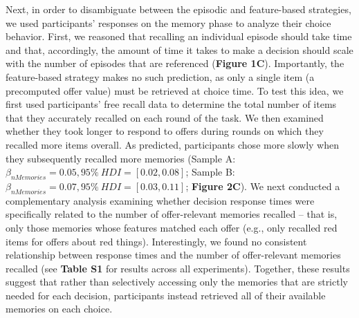 \documentclass[10pt,letterpaper]{article}
\begin{document}
Next, in order to disambiguate between the episodic and feature-based strategies, we used participants' responses on the memory phase to analyze their choice behavior. First, we reasoned that recalling an individual episode should take time\cite{ratcliffTheoryMemoryRetrieval1978, sederbergContextbasedTheoryRecency2008, kahanaFoundationsHumanMemory2012} and that, accordingly, the amount of time it takes to make a decision should scale with the number of episodes that are referenced (\textbf{Figure 1C}). Importantly, the feature-based strategy makes no such prediction, as only a single item (a precomputed offer value) must be retrieved at choice time. To test this idea, we first used participants' free recall data to determine the total number of items that they accurately recalled on each round of the task. We then examined whether they took longer to respond to offers during rounds on which they recalled more items overall. As predicted, participants chose more slowly when they subsequently recalled more memories (Sample A: $\beta_{nMemories} = 0.05, 95\% \ HDI = [0.02, 0.08]$; Sample B: $\beta_{nMemories} = 0.07, 95\% \ HDI = [0.03, 0.11]$; \textbf{Figure 2C}). We next conducted a complementary analysis examining whether decision response times were specifically related to the number of offer-relevant memories recalled -- that is, only those memories whose features matched each offer (e.g., only recalled red items for offers about red things). Interestingly, we found no consistent relationship between response times and the number of offer-relevant memories recalled (see \textbf{Table S1} for results across all experiments). Together, these results suggest that rather than selectively accessing only the memories that are strictly needed for each decision, participants instead retrieved all of their available memories on each choice.
\end{document}
